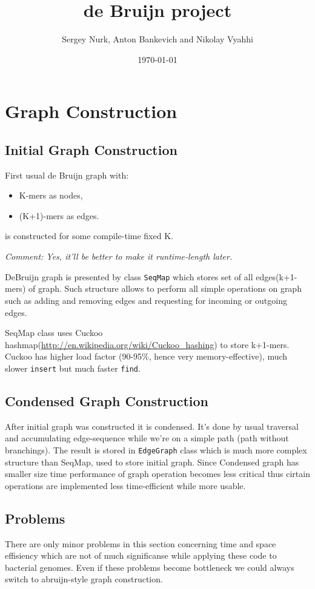 \documentclass[14pt]{article}
\title{de Bruijn project}
\author{Sergey Nurk, Anton Bankevich and Nikolay Vyahhi}
\date{\today}
\begin{document}
\maketitle

\section{Graph Construction}
\subsection{Initial Graph Construction}

First usual de Bruijn graph with:
\begin{itemize}
\item K-mers as nodes,
\item (K+1)-mers as edges.
\end{itemize}
is constructed for some compile-time fixed K. 

\textit{Comment: Yes, it'll be better to make it runtime-length later.}

DeBruijn graph is presented by class \texttt{SeqMap} which stores set of all edges(k+1-mers) of graph. Such structure allows to perform all simple operations on graph such as adding and removing edges and requesting for incoming or outgoing edges.

SeqMap class uses Cuckoo hashmap(\url{http://en.wikipedia.org/wiki/Cuckoo_hashing}) to store k+1-mers. Cuckoo has higher load factor (90-95\%, hence very memory-effective), much slower \texttt{insert} but much faster \texttt{find}.

\subsection{Condensed Graph Construction}

After initial graph was constructed it is condensed. It's done by usual traversal and accumulating edge-sequence while we're on a simple path (path without branchings). The result is stored in \texttt{EdgeGraph} class which is much more complex structure than SeqMap, used to store initial graph. Since Condensed graph has smaller size time performance of graph operation becomes less critical thus cirtain operations are implemented less time-efficient while more usable.

\subsection{Problems}
There are only minor problems in this section concerning time and space effisiency which are not of much significanse while applying these code to bacterial genomes. Even if these problems become bottleneck we could always switch to abruijn-style graph construction.
\end{document}
